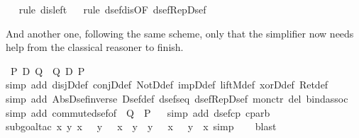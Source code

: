 \begin{isabellebody}
\ \ \isamarkupfalse%
rule\ dis{\isacharunderscore}left{}{\isacharparenright}\isanewline
\ \ \isamarkupfalse%
rule\ dsef{\isacharunderscore}dis{\isacharbrackleft}OF\ dsef{\isacharunderscore}Rep{\isacharunderscore}Dsef{\isacharbrackright}{\isacharparenright}\isanewline
\isamarkupfalse%
\isamarkupfalse%
%
\begin{isamarkuptext}%
And another one, following the same scheme, only that the simplifier now
  needs help from the classical reasoner to finish.%
\end{isamarkuptext}%
\isamarkuptrue%
\ {\isachardoublequote}{\isacharparenleft}P\ {\isasymoplus}\isactrlsub D\ Q{\isacharparenright}\ {\isacharequal}\ {\isacharparenleft}Q\ {\isasymoplus}\isactrlsub D\ P{\isacharparenright}{\isachardoublequote}\isanewline
\ \ \isamarkupfalse%
simp\ add{\isacharcolon}\ disjD{\isacharunderscore}def\ conjD{\isacharunderscore}def\ NotD{\isacharunderscore}def\ impD{\isacharunderscore}def\ liftM{}{\isacharunderscore}def\ xorD{\isacharunderscore}def\ Ret{\isacharunderscore}def{\isacharparenright}\isanewline
\ \ \isamarkupfalse%
simp\ add{\isacharcolon}\ Abs{\isacharunderscore}Dsef{\isacharunderscore}inverse\ Dsef{\isacharunderscore}def\ dsef{\isacharunderscore}seq\ dsef{\isacharunderscore}Rep{\isacharunderscore}Dsef\ mon{\isacharunderscore}ctr\ del{\isacharcolon}\ bind{\isacharunderscore}assoc{\isacharparenright}\isanewline
\ \ \isamarkupfalse%
simp\ add{\isacharcolon}\ commute{\isacharunderscore}dsef{\isacharbrackleft}of\ {\isachardoublequote}{\isasymDown}\ Q{\isachardoublequote}\ {\isachardoublequote}{\isasymDown}\ P{\isachardoublequote}{\isacharbrackright}{\isacharparenright}\isanewline
\ \ \isamarkupfalse%
simp\ add{\isacharcolon}\ dsef{\isacharunderscore}cp\ cp{\isacharunderscore}arb{\isacharparenright}\isanewline
\ \ \isamarkupfalse%
subgoal{\isacharunderscore}tac\ {\isachardoublequote}{\isasymforall}x\ y{\isachardot}\ {\isacharparenleft}x\ {\isasymand}\ {\isasymnot}\ y\ {\isasymor}\ {\isasymnot}\ x\ {\isasymand}\ y{\isacharparenright}\ {\isacharequal}\ {\isacharparenleft}y\ {\isasymand}\ {\isasymnot}\ x\ {\isasymor}\ {\isasymnot}\ y\ {\isasymand}\ x{\isacharparenright}{\isachardoublequote}{\isacharcomma}\ simp{\isacharparenright}\isanewline
\ \ \isamarkupfalse%
\ blast\isamarkupfalse%

\end{isabellebody}
